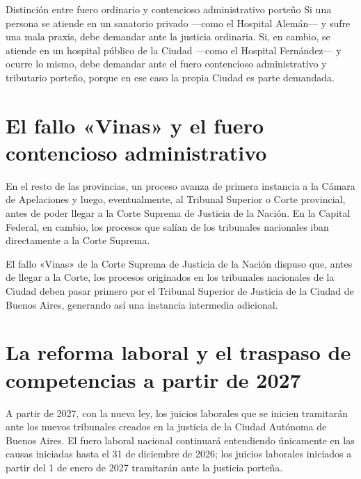 \documentclass[12pt,oneside]{book}
\begin{document}
\begin{example}{Distinción entre fuero ordinario y contencioso administrativo porteño}
Si una persona se atiende en un sanatorio privado —como el Hospital Alemán— y sufre una mala praxis, debe demandar ante la justicia ordinaria. Si, en cambio, se atiende en un hospital público de la Ciudad —como el Hospital Fernández— y ocurre lo mismo, debe demandar ante el fuero contencioso administrativo y tributario porteño, porque en ese caso la propia Ciudad es parte demandada.
\end{example}

\section{El fallo «Vinas» y el fuero contencioso administrativo}

En el resto de las provincias, un proceso avanza de primera instancia a la Cámara de Apelaciones y luego, eventualmente, al Tribunal Superior o Corte provincial, antes de poder llegar a la Corte Suprema de Justicia de la Nación. En la Capital Federal, en cambio, los procesos que salían de los tribunales nacionales iban directamente a la Corte Suprema.

\begin{important}
El fallo «Vinas» de la Corte Suprema de Justicia de la Nación dispuso que, antes de llegar a la Corte, los procesos originados en los tribunales nacionales de la Ciudad deben pasar primero por el Tribunal Superior de Justicia de la Ciudad de Buenos Aires, generando así una instancia intermedia adicional.
\end{important}

\section{La reforma laboral y el traspaso de competencias a partir de 2027}

A partir de 2027, con la nueva ley, los juicios laborales que se inicien tramitarán ante los nuevos tribunales creados en la justicia de la Ciudad Autónoma de Buenos Aires. El fuero laboral nacional continuará entendiendo únicamente en las causas iniciadas hasta el 31 de diciembre de 2026; los juicios laborales iniciados a partir del 1 de enero de 2027 tramitarán ante la justicia porteña.

\end{document}
